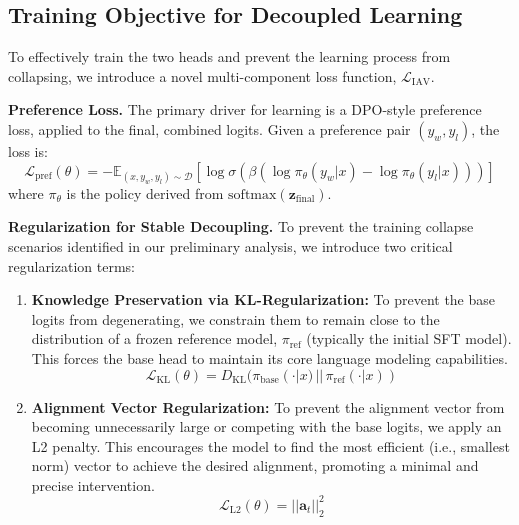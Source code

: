\documentclass{article} %
\begin{document}
\subsection{Training Objective for Decoupled Learning}

To effectively train the two heads and prevent the learning process from collapsing, we introduce a novel multi-component loss function, $\mathcal{L}_{\text{IAV}}$.

\textbf{Preference Loss.} The primary driver for learning is a DPO-style preference loss, applied to the final, combined logits. Given a preference pair $(y_w, y_l)$, the loss is:
\begin{equation}
\mathcal{L}_{\text{pref}}(\theta) = -\mathbb{E}_{(x, y_w, y_l) \sim \mathcal{D}} \left[ \log \sigma \left( \beta \left( \log \pi_{\theta}(y_w|x) - \log \pi_{\theta}(y_l|x) \right) \right) \right]
\end{equation}
where $\pi_{\theta}$ is the policy derived from $\text{softmax}(\mathbf{z}_{\text{final}})$.

\textbf{Regularization for Stable Decoupling.} To prevent the training collapse scenarios identified in our preliminary analysis, we introduce two critical regularization terms:

\begin{enumerate}
    \item \textbf{Knowledge Preservation via KL-Regularization:} To prevent the base logits from degenerating, we constrain them to remain close to the distribution of a frozen reference model, $\pi_{\text{ref}}$ (typically the initial SFT model). This forces the base head to maintain its core language modeling capabilities.
    \begin{equation}
    \mathcal{L}_{\text{KL}}(\theta) = D_{\text{KL}}(\pi_{\text{base}}(\cdot|x) \,||\, \pi_{\text{ref}}(\cdot|x))
    \end{equation}
    \item \textbf{Alignment Vector Regularization:} To prevent the alignment vector from becoming unnecessarily large or competing with the base logits, we apply an L2 penalty. This encourages the model to find the most efficient (i.e., smallest norm) vector to achieve the desired alignment, promoting a minimal and precise intervention.
    \begin{equation}
    \mathcal{L}_{\text{L2}}(\theta) = ||\mathbf{a}_t||_2^2
    \end{equation}
\end{enumerate}
\end{document}
